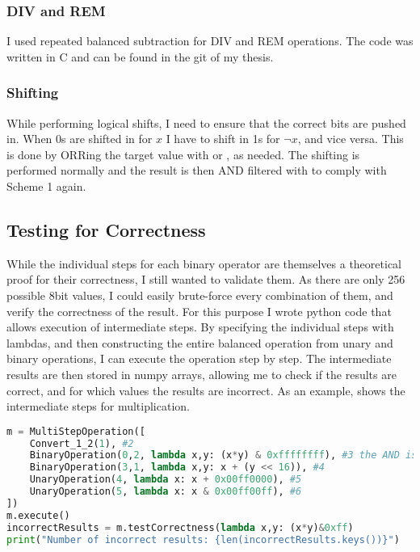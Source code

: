 \subsubsection{DIV and REM}
I used repeated balanced subtraction for DIV and REM operations.
The code was written in C and can be found in the git of my thesis\cite{git}.

\subsubsection{Shifting}
While performing logical shifts, I need to ensure that the correct bits are pushed in.
When 0s are shifted in for $x$ I have to shift in 1s for $\neg{x}$, and vice versa.
This is done by ORRing the target value with  or , as needed.
The shifting is performed normally and the result is then AND filtered with  to comply with Scheme 1 again.

\subsection{Testing for Correctness}
While the individual steps for each binary operator are themselves a theoretical proof for their correctness, I still wanted to validate them.
As there are only 256 possible 8bit values, I could easily brute-force every combination of them, and verify the correctness of the result.
For this purpose I wrote python code that allows execution of intermediate steps.
By specifying the individual steps with lambdas, and then constructing the entire balanced operation from unary and binary operations, I can execute the operation step by step.
The intermediate results are then stored in numpy arrays, allowing me to check if the results are correct, and for which values the results are incorrect.
As an example,  shows the intermediate steps for multiplication.

\begin{lstlisting}[language=python, caption=Step-by-step execution of balanced multiplication, label=lst:multiop]
m = MultiStepOperation([
    Convert_1_2(1), #2
    BinaryOperation(0,2, lambda x,y: (x*y) & 0xffffffff), #3 the AND is required due to python's arbitrary precision integers
    BinaryOperation(3,1, lambda x,y: x + (y << 16)), #4
    UnaryOperation(4, lambda x: x + 0x00ff0000), #5
    UnaryOperation(5, lambda x: x & 0x00ff00ff), #6
])
m.execute()
incorrectResults = m.testCorrectness(lambda x,y: (x*y)&0xff)
print("Number of incorrect results: {len(incorrectResults.keys())}")
\end{lstlisting}

